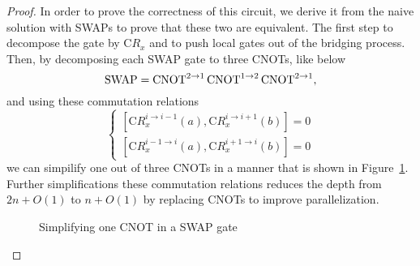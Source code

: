 \begin{proof}
  In order to prove the correctness of this circuit, we derive it from the naive solution with SWAPs to prove that these two are equivalent. The first step to decompose the gate by $\mathrm{C}R_x$ and to push local gates out of the bridging process. Then, by decomposing each SWAP gate to three CNOTs, like below
\begin{equation}
  \mathrm{SWAP} = \operatorname{CNOT}^{2 \to 1} \operatorname{CNOT}^{1 \to 2} \operatorname{CNOT}^{2 \to 1},
\end{equation}
and using these commutation relations
\begin{equation}
  \begin{cases}
  [\mathrm{C}R_x^{i \to i-1}(a), \mathrm{C}R_x^{i \to i+1}(b)] = 0 \\
  [\mathrm{C}R_x^{i-1 \to i}(a), \mathrm{C}R_x^{i+1 \to i}(b)] = 0
  \end{cases}
\end{equation}
we can simpilify one out of three CNOTs in a manner that is shown in Figure~\ref{fig:bridged-class-i-proof}. Further simplifications these commutation relations reduces the depth from $2n + O(1)$ to $n + O(1)$ by replacing CNOTs to improve parallelization.

\begin{figure}[ht]
  \label{fig:bridged-class-i-proof}
  \centering
  \caption{Simplifying one CNOT in a SWAP gate}
\end{figure}
\end{proof}

